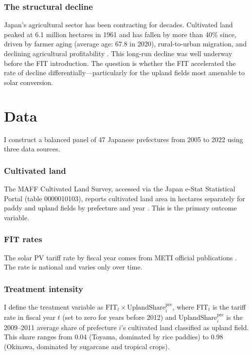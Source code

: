 \documentclass[12pt]{article}
\begin{document}
\subsubsection*{The structural decline} Japan's agricultural sector has been contracting for decades. Cultivated land peaked at 6.1 million hectares in 1961 and has fallen by more than 40\% since, driven by farmer aging (average age: 67.8 in 2020), rural-to-urban migration, and declining agricultural profitability \citep{Asai2022, Oda2019}. This long-run decline was well underway before the FIT introduction. The question is whether the FIT accelerated the rate of decline differentially---particularly for the upland fields most amenable to solar conversion.


\section{Data}

I construct a balanced panel of 47 Japanese prefectures from 2005 to 2022 using three data sources.

\subsubsection*{Cultivated land} The MAFF Cultivated Land Survey, accessed via the Japan e-Stat Statistical Portal (table 0000010103), reports cultivated land area in hectares separately for paddy and upland fields by prefecture and year \citep{MAFF2023}. This is the primary outcome variable.

\subsubsection*{FIT rates} The solar PV tariff rate by fiscal year comes from METI official publications \citep{METI2022}. The rate is national and varies only over time.

\subsubsection*{Treatment intensity} I define the treatment variable as $\text{FIT}_{t} \times \text{UplandShare}_{i}^{\text{pre}}$, where $\text{FIT}_t$ is the tariff rate in fiscal year $t$ (set to zero for years before 2012) and $\text{UplandShare}_{i}^{\text{pre}}$ is the 2009--2011 average share of prefecture $i$'s cultivated land classified as upland field. This share ranges from 0.04 (Toyama, dominated by rice paddies) to 0.98 (Okinawa, dominated by sugarcane and tropical crops).
\end{document}
